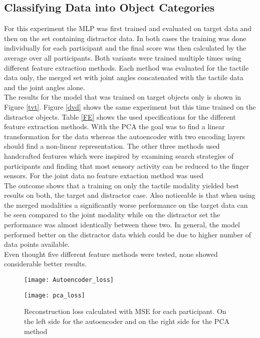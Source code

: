 \subsection{Classifying Data into Object Categories}\label{e2}
For this experiment the MLP was first trained and evaluated on target data and then on the set containing distractor data. In both cases the training was done individually for each participant and the final score was then calculated by the average over all participants. Both variants were trained multiple times using different feature extraction methods. Each method was evaluated for the tactile data only, the merged set with joint angles concatenated with the tactile data and the joint angles alone.\\ 
The results for the model that was trained on target objects only is shown in Figure \ref{tvt}. Figure \ref{dvd} shows the same experiment but this time trained on the distractor objects. Table \ref{FE} shows the used specifications for the different feature extraction methods. With the PCA the goal was to find a linear transformation for the data whereas the autoencoder with two encoding layers should find a non-linear representation. The other three methods used handcrafted features which were inspired by examining search strategies of participants and finding that most sensory activity can be reduced to the finger sensors. For the joint data no feature extaction method was used \\
The outcome shows that a training on only the tactile modality yielded best results on both, the target and distractor case. Also noticeable is that when using the merged modalities a significantly worse performance on the target data can be seen compared to the joint modality while on the distractor set the performance was almost identically between these two. In general, the model performed better on the distractor data which could be due to higher number of data points available.\\
Even thought five different feature methods were tested, none showed considerable better results. 

\begin{figure}[H]
	\centering
	\begin{minipage}{0.495\textwidth}
		\centering
		\texttt{[image: Autoencoder\_loss]}
	\end{minipage}
	\begin{minipage}{0.495\textwidth}
		\centering
		\texttt{[image: pca\_loss]}
	\end{minipage}
	\caption{Reconstruction loss calculated with MSE for each participant. On the left side for the autoencoder and on the right side for the PCA method}
	\label{ae_pca_loss}
\end{figure}

